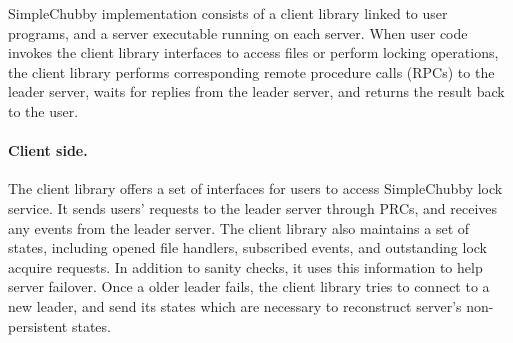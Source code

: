 %

SimpleChubby implementation consists of a client library linked to user programs,
and a server executable running on each server.
When user code invokes the client library interfaces to access files or perform locking operations,
the client library performs corresponding remote procedure calls (RPCs) to the leader server,
waits for replies from the leader server, and returns the result back to the user.

\paragraph{Client side.}
The client library offers a set of interfaces for users to access SimpleChubby
lock service. It sends users' requests to the leader server through PRCs,
and receives any events from the leader server.
The client library also maintains a set of states, including opened file handlers,
subscribed events, and outstanding lock acquire requests.
In addition to sanity checks, it uses this information to help server failover.
Once a older leader fails, the client library tries to connect to a new leader,
and send its states which are necessary to reconstruct server's non-persistent
states.


